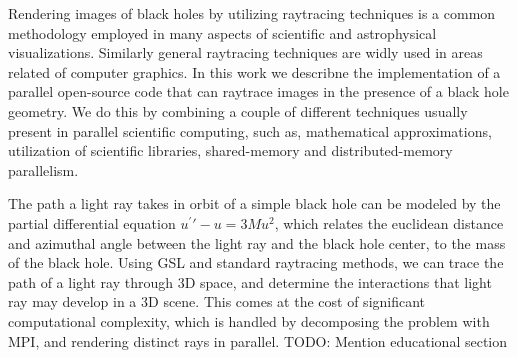 Rendering images of black holes by utilizing raytracing techniques is a common
methodology employed in many aspects of scientific and astrophysical visualizations.
Similarly general raytracing techniques are widly used in areas related of computer graphics.
In this work we describne the implementation of a parallel open-source code that can raytrace images in the presence of a black hole geometry.
We do this by combining a couple of different techniques usually present in parallel scientific computing,
such as, mathematical approximations, utilization of scientific libraries, shared-memory and distributed-memory parallelism.

The path a light ray takes in orbit of a simple black hole can be modeled by
the partial differential equation $u^\prime\prime - u = 3Mu^2$, which relates
the euclidean distance and azimuthal angle between the light ray and the black
hole center, to the mass of the black hole.
Using GSL and standard raytracing methods, we can trace the path of a light ray
through 3D space, and determine the interactions that light ray may develop in a 3D scene.
This comes at the cost of significant computational complexity, which is handled by decomposing
the problem with MPI, and rendering distinct rays in parallel. TODO: Mention educational section

